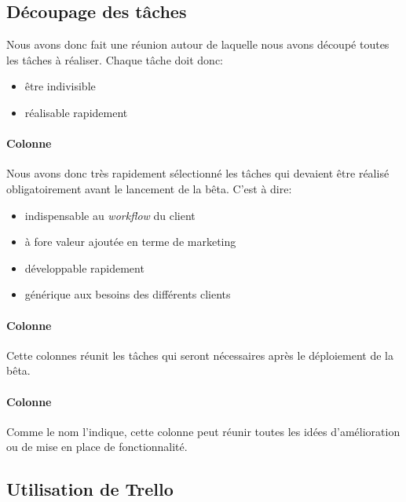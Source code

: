 \documentclass[]{report}
\begin{document}
    \subsection{Découpage des tâches}

      Nous avons donc fait une réunion autour de laquelle nous avons découpé toutes les tâches à réaliser. Chaque tâche doit donc:

      \begin{itemize}
        \item être indivisible
        \item réalisable rapidement
      \end{itemize}

      \paragraph{Colonne }

        Nous avons donc très rapidement sélectionné les tâches qui devaient être réalisé obligatoirement avant le lancement de la bêta. C'est à dire:

        \begin{itemize}
          \item indispensable au \textit{workflow} du client
          \item à fore valeur ajoutée en terme de marketing
          \item développable rapidement
          \item générique aux besoins des différents clients
        \end{itemize}

      \paragraph{Colonne }

        Cette colonnes réunit les tâches qui seront nécessaires après le déploiement de la bêta.

      \paragraph{Colonne }

        Comme le nom l'indique, cette colonne peut réunir toutes les idées d'amélioration ou de mise en place de fonctionnalité.

    \subsection{Utilisation de Trello}
\end{document}
